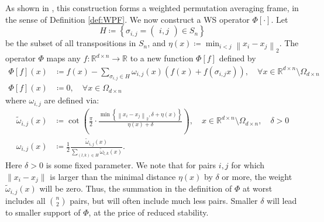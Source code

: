 \documentclass{amsart}
\theoremstyle{plain}
\theoremstyle{definition}
\theoremstyle{remark}
\DeclareMathOperator*{\argsort}{arg\,sort}
\DeclareMathOperator{\sign}{sign}
\newcommand{\RR}{\mathbb{R}}
\newcommand{\abs}[1]{\left\lvert#1\right\rvert}
\newcommand{\normp}[2]{\left\|#1\right\|_{#2}}
\begin{document}
As shown in \cite{frames}, this construction forms a weighted permutation averaging frame, in the sense of Definition \ref{def:WPF}. 
%
 We now construct a WS operator $\Phi[\cdot]$. 
Let 
\begin{equation}\label{eq:all_transpositions}
    H \coloneq \left \{
    \sigma_{i,j} = \begin{pmatrix}
  i, j
\end{pmatrix} \in S_n  \right\}
\end{equation}
be the subset of all transpositions in $S_n$, and $\eta(x) \coloneq \min_{i < j}{\normp{x_i - x_j}{2}}$.
The operator $\Phi$ maps any $f: \RR^{d \times n} \to \RR$ to a new function $\Phi[f]$ defined by
\begin{align} \label{def:staboperator}
        \Phi[f](x) &\coloneq f(x) - \sum_{\sigma_{i,j} \in H}{\omega_{i,j}(x)\left(f(x) + f(\sigma_{i,j} x) \right)}, \quad \forall x\in \RR^{d\times n}\setminus \Omega_{d\times n}\\
         \Phi[f](x) &\coloneq 0, \quad \forall x \in \Omega_{d\times n} \nonumber
\end{align}
 where $\omega_{i,j}$ are defined via:
\begin{equation} \label{def:small_omega} \begin{split}
\tilde{\omega}_{i,j}(x) &\coloneq \cot \left( \frac{\pi}{2}\cdot  \frac{\min{\left\{\left\| x_i - x_j \right\|_2, \delta + \eta(x) \right\}}}{\eta(x) + \delta}\right), \quad x \in \RR^{d \times n} \setminus{\Omega_{d \times n}}, \quad \delta > 0 \\
    \omega_{i, j}(x) &\coloneq \frac{1}{2}\frac{\tilde{\omega}_{i, j}(x)}{ \sum_{(l, k) \in H}{\tilde{\omega}_{l,k}(x)}}.
\end{split} \end{equation}
Here $\delta > 0$ is some fixed parameter. We note that for pairs $i,j$ for which $\|x_i-x_j\|$ is larger than the minimal distance $\eta(x)$ by $\delta$ or more, the weight $\tilde \omega_{i,j}(x)$ will be zero. Thus, the summation in the definition of $\Phi$ at worst includes all $n \choose 2 $ pairs, but will often include much less pairs. Smaller $\delta$ will lead to smaller support of $\Phi$, at the price of reduced stability. 
\end{document}
